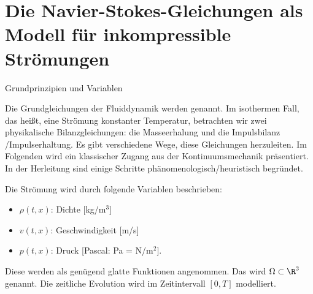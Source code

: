 \section{Die Navier-Stokes-Gleichungen als Modell für inkompressible Strömungen}
\begin{bemerkung}
  Grundprinzipien und Variablen

Die Grundgleichungen der Fluiddynamik werden  genannt. Im isothermen Fall, das heißt, eine Strömung konstanter Temperatur, betrachten wir zwei physikalische Bilanzgleichungen: die Masseerhalung und die Impulsbilanz /Impulserhaltung. Es gibt verschiedene Wege, diese Gleichungen herzuleiten. Im Folgenden wird ein klassischer Zugang aus der Kontinuumsmechanik präsentiert. In der Herleitung sind einige Schritte phänomenologisch/heuristisch begründet. 

Die Strömung wird durch folgende Variablen beschrieben:
\begin{itemize}
\item $\rho(t, x)$: Dichte [kg/m$^{3}$]
\item $v(t, x)$: Geschwindigkeit [m/s]
\item $p(t, x)$: Druck [Pascal: Pa = N/m$^{2}$].
\end{itemize}
Diese werden als genügend glatte Funktionen angenommen. Das  wird $\Omega \subset \R^{3}$ genannt. Die zeitliche Evolution wird im Zeitintervall $[0, T]$ modelliert. 
\end{bemerkung}

